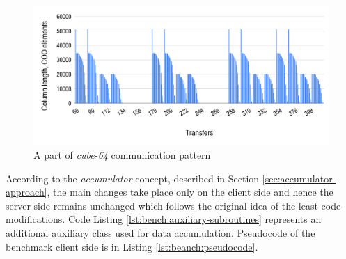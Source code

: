 \begin{figure}[!htpb]
  \centering
  \includegraphics[width=1.0\textwidth]{figures/chapter-3/communication-pattern.png}
  \caption{A part of \textit{cube-64} communication pattern} \label{fig:communication-pattern}
\end{figure}


According to the \textit{accumulator} concept, described in Section \ref{sec:accumulator-approach}, the main changes take place only on the client side and hence the server side remains unchanged which follows the original idea of the least code modifications. Code Listing \ref{lst:bench:auxiliary-subroutines} represents an additional auxiliary class used for data accumulation. Pseudocode of the benchmark client side is in Listing \ref{lst:beanch:pseudocode}.\\ 


